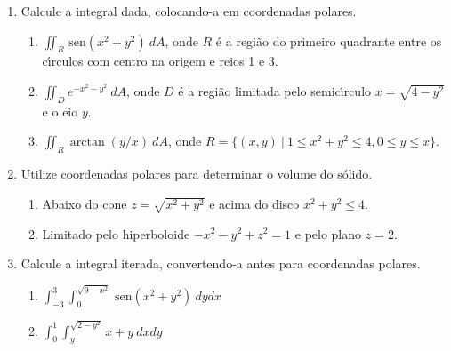 \documentclass[a4paper,5pt]{amsbook}
\newcommand{\sen}{\,\mbox{sen}}
\newcommand{\ds}{\displaystyle}
\begin{document}
\vspace{1cm}
\begin{enumerate}
    \setlength\itemsep{0.5cm}
    \item Calcule a integral dada, colocando-a em coordenadas polares.
        \begin{enumerate}
            \setlength\itemsep{0.3cm}
            \item $\ds\iint_R \sen{(x^2+y^2)}\ dA$, onde $R$ \'e a regi\~ao do
            primeiro quadrante entre os c\'{\i}rculos com centro na origem e reios 1
            e 3.
            \item $\ds\iint_D e^{-x^2-y^2}\ dA$, onde $D$ \'e a regi\~ao limitada
            pelo semic\'{\i}rculo $x=\sqrt{4-y^2}$ e o eio $y$.
            \item $\ds\iint_R \arctan{(y/x)}\ dA$, onde $R=\{(x,y)\ |\ 1\le
            x^2+y^2\le 4, 0\le y\le x\}$.
        \end{enumerate}

    \item Utilize coordenadas polares para determinar o volume do s\'olido.
        \begin{enumerate}
            \setlength\itemsep{0.3cm}
            \item Abaixo do cone $z=\sqrt{x^2+y^2}$ e acima do disco
            $x^2+y^2\le 4$.
            \item Limitado pelo hiperboloide $-x^2-y^2+z^2=1$ e pelo plano
            $z=2$.
        \end{enumerate}

    \item Calcule a integral iterada, convertendo-a antes para coordenadas
    polares.
        \begin{enumerate}
            \setlength\itemsep{0.3cm}
            \item $\ds\int_{-3}^{3} \int_0^{\sqrt{9-x^2}} \sen{(x^2+y^2)}\ dydx$
            \item $\ds\int_0^1 \int_y^{\sqrt{2-y^2}} x+y\ dxdy$
        \end{enumerate}
\end{enumerate}
\end{document}
